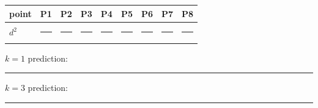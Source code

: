\documentclass[
  11pt,
]{article}
\newcounter{none} %
\newcommand{\blank}[1][1.2in]{\rule{#1}{0.4pt}}
\begin{document}
{\def\LTcaptype{none} %
\begin{longtable}[]{@{}
  >{\raggedright\arraybackslash}p{}
  >{\raggedright\arraybackslash}p{}
  >{\raggedright\arraybackslash}p{}
  >{\raggedright\arraybackslash}p{}
  >{\raggedright\arraybackslash}p{}
  >{\raggedright\arraybackslash}p{}
  >{\raggedright\arraybackslash}p{}
  >{\raggedright\arraybackslash}p{}
  >{\raggedright\arraybackslash}p{}@{}}
\toprule\noalign{}
\begin{minipage}[b]{\linewidth}\raggedright
point
\end{minipage} & \begin{minipage}[b]{\linewidth}\raggedright
P1
\end{minipage} & \begin{minipage}[b]{\linewidth}\raggedright
P2
\end{minipage} & \begin{minipage}[b]{\linewidth}\raggedright
P3
\end{minipage} & \begin{minipage}[b]{\linewidth}\raggedright
P4
\end{minipage} & \begin{minipage}[b]{\linewidth}\raggedright
P5
\end{minipage} & \begin{minipage}[b]{\linewidth}\raggedright
P6
\end{minipage} & \begin{minipage}[b]{\linewidth}\raggedright
P7
\end{minipage} & \begin{minipage}[b]{\linewidth}\raggedright
P8
\end{minipage} \\
\midrule\noalign{}
\endhead
\bottomrule\noalign{}
\endlastfoot
\(d^2\) & \blank[0.45in] & \blank[0.45in] & \blank[0.45in] &
\blank[0.45in] & \blank[0.45in] & \blank[0.45in] & \blank[0.45in] &
\blank[0.45in] \\
\end{longtable}
}

\(k = 1\) prediction: \blank[0.8in]\quad \(k = 3\) prediction:
\blank[0.8in]
\end{document}
